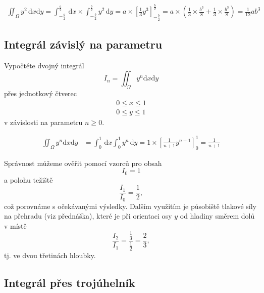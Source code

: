 \reseni


$$
\begin{aligned}
  \iint_\Omega y^2\,\mathrm dx \mathrm dy
  = \int_{-\frac a2}^{\frac a2} \,\mathrm dx \times \int_{-\frac b2}^{\frac b2}y^2\,\mathrm dy=a\times \left[\frac 13 y^3\right]_{-\frac b2}^{\frac b2}=a\times \left(\frac 13 \times \frac {b^3}{8} + \frac 13 \times \frac {b^3}{8}\right)=
  \frac 1{12}ab^3
\end{aligned}
$$

\konec

\subsection{Integrál závislý na parametru}


Vypočtěte dvojný integrál $$I_n=\iint_\Omega y^n\mathrm dx\mathrm dy$$
přes jednotkový čtverec $$
\begin{gathered}
  0\leq x\leq 1\\0\leq y\leq 1
\end{gathered}
$$
v závislosti na parametru $n\geq 0$.

\reseni

$$
\begin{aligned}
  \iint_\Omega y^n\mathrm dx\mathrm dy
  &=\int_0^1\,\mathrm dx \int _0^1 y^n \,\mathrm dy
  =1 \times \left[\frac 1{n+1} y^{n+1} \right]_0^1
  =\frac 1{n+1}
\end{aligned}$$


Správnost můžeme ověřit pomocí vzorců pro obsah  $$I_0=1$$ a polohu težiště $$\frac{I_1}{I_0}=\frac 12,$$
což porovnáme s očekávanými výsledky. Dalším využitím je působiště tlakové síly na přehradu (viz přednáška), které je při orientaci osy $y$ od hladiny směrem dolů v místě
$$\frac{I_2}{I_1}=\frac {\frac 13}{\frac 12}=\frac 23,$$
tj. ve dvou třetinách hloubky.

\konec


\subsection{Integrál přes trojúhelník}

